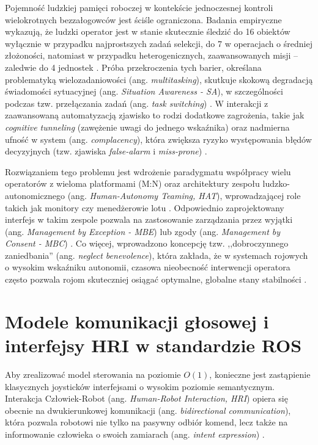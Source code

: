 \documentclass[12pt,a4paper,twoside]{report}
\theoremstyle{definition} %
\begin{document}
Pojemność ludzkiej pamięci roboczej w kontekście jednoczesnej kontroli wielokrotnych bezzałogowców jest ściśle ograniczona. Badania empiryczne wykazują, że ludzki operator jest w stanie skutecznie śledzić do 16 obiektów wyłącznie w przypadku najprostszych zadań selekcji, do 7 w operacjach o średniej złożoności, natomiast w przypadku heterogenicznych, zaawansowanych misji -- zaledwie do 4 jednostek \cite{dia2010}. Próba przekroczenia tych barier, określana problematyką wielozadaniowości (ang. \textit{multitasking}), skutkuje skokową degradacją świadomości sytuacyjnej (ang. \textit{Situation Awareness - SA}), w szczególności podczas tzw. przełączania zadań (ang. \textit{task switching}) \cite{chen2010}. W interakcji z zaawansowaną automatyzacją zjawisko to rodzi dodatkowe zagrożenia, takie jak \textit{cognitive tunneling} (zawężenie uwagi do jednego wskaźnika) oraz nadmierna ufność w system (ang. \textit{complacency}), która zwiększa ryzyko występowania błędów decyzyjnych (tzw. zjawiska \textit{false-alarm} i \textit{miss-prone}) \cite{chen2010}.

Rozwiązaniem tego problemu jest wdrożenie paradygmatu współpracy wielu operatorów z wieloma platformami (M:N) oraz architektury zespołu ludzko-autonomicznego (ang. \textit{Human-Autonomy Teaming, HAT}), wprowadzającej role takich jak monitory czy menedżerowie lotu \cite{smith2021}. Odpowiednio zaprojektowany interfejs w takim zespole pozwala na zastosowanie zarządzania przez wyjątki (ang. \textit{Management by Exception - MBE}) lub zgody (ang. \textit{Management by Consent - MBC}) \cite{chen2010}. Co więcej, wprowadzono koncepcję tzw. ,,dobroczynnego zaniedbania'' (ang. \textit{neglect benevolence}), która zakłada, że w systemach rojowych o wysokim wskaźniku autonomii, czasowa nieobecność interwencji operatora często pozwala rojom skuteczniej osiągać optymalne, globalne stany stabilności \cite{kolling2016}.

\section{Modele komunikacji głosowej i interfejsy HRI w standardzie ROS}
Aby zrealizować model sterowania na poziomie $O(1)$, konieczne jest zastąpienie klasycznych joysticków interfejsami o wysokim poziomie semantycznym. Interakcja Człowiek-Robot (ang. \textit{Human-Robot Interaction, HRI}) opiera się obecnie na dwukierunkowej komunikacji (ang. \textit{bidirectional communication}), która pozwala robotowi nie tylko na pasywny odbiór komend, lecz także na informowanie człowieka o swoich zamiarach (ang. \textit{intent expression}) \cite{pomianek2026}.
\end{document}
